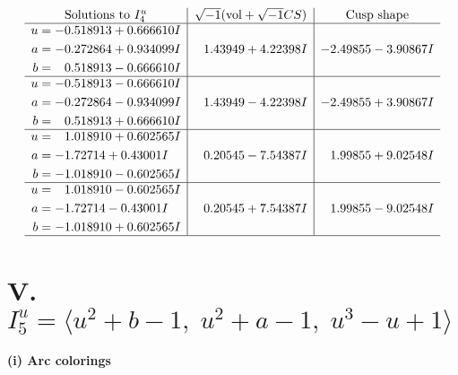 \documentclass[1p]{elsarticle_modified}
\theoremstyle{definition}
\newcommand{\I}{\sqrt{-1}}
\begin{document}
$$\begin{array}{c|c|c}  
\text{Solutions to }I^u_{4}& \I (\text{vol} + \sqrt{-1}CS) & \text{Cusp shape}\\
 \hline 
\begin{aligned}
u &= -0.518913 + 0.666610 I \\
a &= -0.272864 + 0.934099 I \\
b &= \phantom{-}0.518913 - 0.666610 I\end{aligned}
 & \phantom{-}1.43949 + 4.22398 I & -2.49855 - 3.90867 I \\ \hline\begin{aligned}
u &= -0.518913 - 0.666610 I \\
a &= -0.272864 - 0.934099 I \\
b &= \phantom{-}0.518913 + 0.666610 I\end{aligned}
 & \phantom{-}1.43949 - 4.22398 I & -2.49855 + 3.90867 I \\ \hline\begin{aligned}
u &= \phantom{-}1.018910 + 0.602565 I \\
a &= -1.72714 + 0.43001 I \\
b &= -1.018910 - 0.602565 I\end{aligned}
 & \phantom{-}0.20545 - 7.54387 I & \phantom{-}1.99855 + 9.02548 I \\ \hline\begin{aligned}
u &= \phantom{-}1.018910 - 0.602565 I \\
a &= -1.72714 - 0.43001 I \\
b &= -1.018910 + 0.602565 I\end{aligned}
 & \phantom{-}0.20545 + 7.54387 I & \phantom{-}1.99855 - 9.02548 I\\
 \hline 
 \end{array}$$\newpage\newpage\renewcommand{\arraystretch}{1}
\centering \section*{V. $I^u_{5}= \langle u^2+b-1,\;u^2+a-1,\;u^3- u+1 \rangle$}
\flushleft \textbf{(i) Arc colorings}\\
\end{document}
